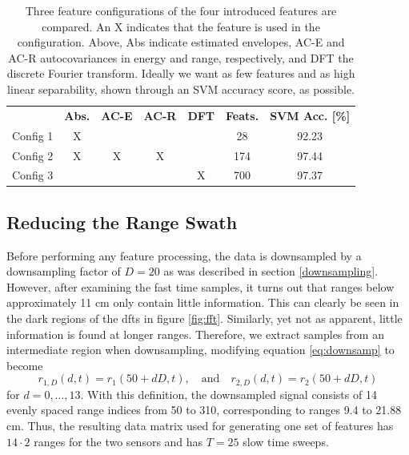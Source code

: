 \begin{table}
\begin{center}
  \begin{tabular}{|c|cccccc|}
\hline
    \rowcolor{gray!150}
		  & \color{white}\textbf{Abs.} & \color{white}\textbf{AC-E} & \color{white}\textbf{AC-R} & \color{white}\textbf{DFT} & \color{white}\textbf{Feats.} & \color{white}\textbf{SVM Acc. [\%]} \\
	  Config 1 & X &   &   &   & 28  & 92.23 \\
	  Config 2 & X & X & X & & 174 & 97.44 \\
	  Config 3 & & & & X & 700 & 97.37 \\
\hline
  \end{tabular}
\end{center}
	\caption{Three feature configurations of the four introduced features are compared. An X indicates that the feature is used in the configuration. Above, Abs indicate estimated envelopes, AC-E and AC-R autocovariances in energy and range, respectively, and DFT the discrete Fourier transform. Ideally we want as few features and as high linear separability, shown through an SVM accuracy score, as possible.} 
\label{tab:feat}
\end{table}



\subsection{Reducing the Range Swath}

Before performing any feature processing, the data is downsampled by a downsampling factor of $D=20$ as was described in section \ref{downsampling}. However, after examining the fast time samples, it turns out that ranges below approximately 11 cm only contain little information. This can clearly be seen in the dark regions of the \gls{dft}s in figure \ref{fig:fft}. Similarly, yet not as apparent, little information is found at longer ranges. Therefore, we extract samples from an intermediate region when downsampling, modifying equation \eqref{eq:downsamp} to become
\begin{equation}
	r_{1,D}(d, t) = r_{1}(50+dD,t), 
	\quad \text{and} \quad r_{2,D}(d,t) = r_{2}(50+dD,t)
\end{equation}
for $d=0,...,13$. With this definition, the downsampled signal consists of 14 evenly spaced range indices from 50 to 310, corresponding to ranges 9.4 to 21.88 cm. Thus, the resulting data matrix used for generating one set of features has $14\cdot 2$ ranges for the two sensors and has $T=25$ slow time sweeps. 

